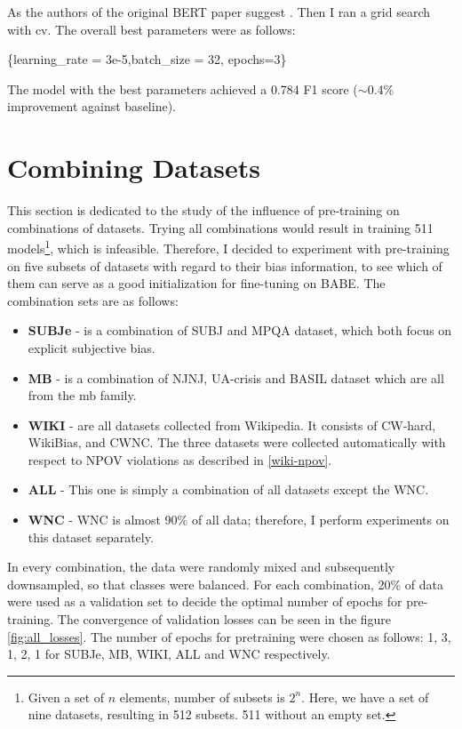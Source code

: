  As the authors of the original BERT paper suggest \cite{devlin2019bert}. Then I ran a grid search with \gls{cv}. The overall best parameters were as follows:
 \begin{center}
      \{learning\_rate = 3e-5,batch\_size = 32, epochs=3\}\label{hyperparams}
 \end{center}
 
 The model with the best parameters achieved a 0.784 F1 score ($\sim$0.4\% improvement against baseline).


 
 





\section{Combining Datasets}
This section is dedicated to the study of the influence of pre-training on combinations of datasets. Trying all combinations would result in training 511 models\footnote{Given a set of $n$ elements, number of subsets is $2^n$. Here, we have a set of nine datasets, resulting in 512 subsets. 511 without an empty set.}, which is infeasible. Therefore, I decided to experiment with pre-training on five subsets of datasets with regard to their bias information, to see which of them can serve as a good initialization for fine-tuning on BABE.
The combination sets are as follows:
\begin{itemize}
    \item \textbf{SUBJe} - is a combination of SUBJ and MPQA dataset, which both focus on explicit subjective bias.
    \item \textbf{MB} - is a combination of NJNJ, UA-crisis and BASIL dataset which are all from the \gls{mb} family.
    \item \textbf{WIKI} - are all datasets collected from Wikipedia. It consists of CW-hard, WikiBias, and CWNC. The three datasets were collected automatically with respect to NPOV violations as described in \ref{wiki-npov}.
    \item \textbf{ALL} - This one is simply a combination of all datasets except the WNC.
    \item \textbf{WNC} - WNC is almost 90\% of all data; therefore, I perform experiments on this dataset separately.
\end{itemize}
 
In every combination, the data were randomly mixed and subsequently downsampled, so that classes were balanced. For each combination, 20\% of data were used as a validation set to decide the optimal number of epochs for pre-training. The convergence of validation losses can be seen in the figure \ref{fig:all_losses}. The number of epochs for pretraining were chosen as follows: 1, 3, 1, 2, 1 for SUBJe, MB, WIKI, ALL and WNC respectively.

